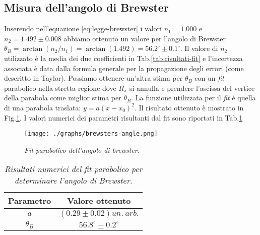 \subsection{Misura dell'angolo di Brewster}\label{subsec:angolo-di-brewster}
  Inserendo nell'equazione \eqref{eq:legge-brewster} i valori $n_1 = 1.000$ e $n_2 = 1.492 \pm 0.008$
  abbiamo ottenuto un valore per l'angolo di Brewster $\theta_B = \arctan{(n_2 / n_1)} = \arctan{(1.492)} = 56.2^\circ \pm 0.1^\circ$. Il valore di $n_2$ utilizzato è la media
  dei due coefficienti in Tab.\ref{tab:risultati-fit} e l'incertezza associata è data dalla formula generale per la
  propagazione degli errori (come descritto in Taylor\cite{taylor99}).
  Possiamo ottenere un'altra stima per $\theta_B$ con un \emph{fit} parabolico nella stretta regione
  dove $R_\pi$ si annulla e prendere l'ascissa del vertice della parabola come miglior stima per $\theta_B$.
  La funzione utilizzata per il \emph{fit} è quella di una parabola traslata: $y = a(x - x_0)^2$.
  Il risultato ottenuto è mostrato in Fig.\ref{fig:brewsters-angle}. I valori numerici
  dei parametri risultanti dal fit sono riportati in Tab.\ref{tab:fit-brewster}
  \begin{figure}[h]
    \centering
    \texttt{[image: ./graphs/brewsters-angle.png]}
    \caption{
      \emph{
        Fit parabolico dell'angolo di brewster.
      }
    }
    \label{fig:brewsters-angle}
  \end{figure}
  \begin{table}[ht]
    \centering
    \begin{tabular}[t]{cc}
      \toprule
      Parametro &Valore ottenuto\\
      \midrule
      $a$ &$(0.29 \pm 0.02) un.\ arb.$ \\
      $\theta_B$ &$56.8^\circ \pm 0.2^\circ$ \\
      \bottomrule
      \end{tabular}
    \caption{
      \emph{
        Risultati numerici del \emph{fit} parabolico per determinare l'angolo di Brewster.
      }
    }
    \label{tab:fit-brewster}
  \end{table}
\endinput



